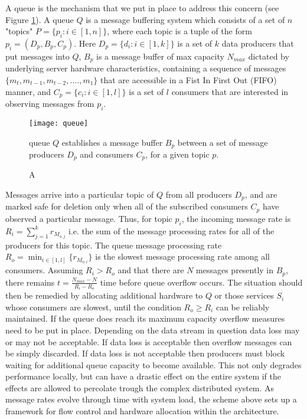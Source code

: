 A queue is the mechanism that we put in place to address this concern (see Figure \ref{fig:queue}). A queue $Q$ is a message buffering system which consists of a set of $n$ "topics" $P = \{p_i: i \in [1,n]\}$, where each topic is a tuple of the form $p_i = (D_p,B_p,C_p)$. Here $D_p = \{d_i: i\in [1,k]\}$ is a set of $k$ data producers that put messages into $Q$, $B_p$ is a message buffer of max capacity $N_{max}$ dictated by underlying server hardware characteristics, containing a sequence of messages $\{m_t, m_{t-1},m_{t-2},....,m_1\}$ that are accessible in a Fist In First Out (FIFO) manner, and $C_p = \{c_i: i \in [1,l]\}$ is a set of $l$ consumers that are interested in observing messages from $p_i$.

\begin{figure}[H]
\texttt{[image: queue]}
\centering
\caption A queue $Q$ establishes a message buffer $B_p$ between a set of message producers $D_p$ and consumers $C_p$, for a given topic $p$.
\label{fig:queue}
\end{figure}

Messages arrive into a particular topic of $Q$ from all producers $D_p$, and are marked safe for deletion only when all of the subscribed consumers $C_p$ have observed a particular message. Thus, for topic $p_i$, the incoming message rate is $\displaystyle R_i = \sum_{j=1}^k r_{M_{o,j}}$ i.e. the sum of the message processing rates for all of the producers for this topic. The queue message processing rate $\displaystyle R_o = \min_{i \in [1,l]}\{r_{M_{o,i}}\}$ is the slowest message processing rate among all consumers. Assuming $R_i > R_o$ and that there are $N$ messages presently in $B_p$, there remains $t = \frac{N_{max} - N} {R_i - R_o}$ time before queue overflow occurs. The situation should then be remedied by allocating additional hardware to $Q$ or those services $S_i$ whose consumers are slowest, until the condition $R_o \ge R_i$ can be reliably maintained. If the queue does reach its maximum capacity overflow measures need to be put in place. Depending on the data stream in question data loss may or may not be acceptable. If data loss is acceptable then overflow messages can be simply discarded. If data loss is not acceptable then producers must block waiting for additional queue capacity to become available. This not only degrades performance locally, but can have a drastic effect on the entire system if the effects are allowed to percolate trough the complex distributed system. As message rates evolve through time with system load, the scheme above sets up a framework for flow control and hardware allocation within the architecture.

